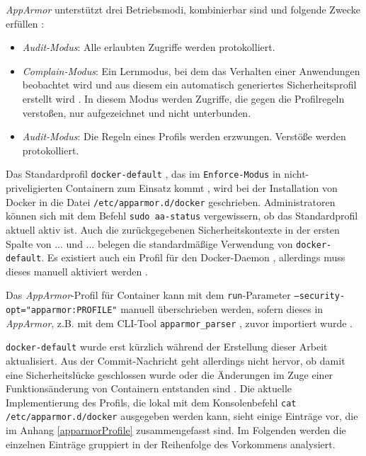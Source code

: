 \documentclass[../main.tex]{subfiles}
\begin{document}
				\emph{AppArmor} unterstützt drei Betriebsmodi, kombinierbar sind und folgende Zwecke erfüllen \cite[S.82]{SELinuxApparmor}:
				\begin{itemize}
					\item \emph{Audit-Modus}: Alle erlaubten Zugriffe werden protokolliert.
					\item \emph{Complain-Modus}: Ein Lernmodus, bei dem das Verhalten einer Anwendungen beobachtet wird und aus diesem ein automatisch generiertes Sicherheitsprofil erstellt wird \cite{linuxSecOverview}. In diesem Modus werden Zugriffe, die gegen die Profilregeln verstoßen, nur aufgezeichnet und nicht unterbunden.
					\item \emph{Audit-Modus}: Die Regeln eines Profils werden erzwungen. Verstöße werden protokolliert.
				\end{itemize}


				Das Standardprofil \texttt{docker-default} \cite{githubAppArmorProfileContainer}, das im \texttt{Enforce-Modus} in nicht-priveligierten Containern zum Einsatz kommt \cite{docker110Security}, wird bei der Installation von Docker in die Datei \texttt{/etc/apparmor.d/docker} geschrieben. Administratoren können sich mit dem Befehl \texttt{sudo aa-status} vergewissern, ob das Standardprofil aktuell aktiv ist. Auch die zurückgegebenen Sicherheitskontexte in der ersten Spalte von \fig ... und \fig ... belegen die standardmäßige Verwendung von \texttt{docker-default}. Es existiert auch ein Profil für den Docker-Daemon \cite{githubAppArmorProfileDaemon}, allerdings muss dieses manuell aktiviert werden \cite{githubAppArmorDoc}.

				Das \emph{AppArmor}-Profil für Container kann mit dem \texttt{run}-Parameter \texttt{--security-opt="apparmor:PROFILE"} manuell überschrieben werden, sofern dieses in \emph{AppArmor}, z.B. mit dem \acrshort{CLI}-Tool \texttt{apparmor\_parser} \cite{apparmorParser}, zuvor importiert wurde \cite{dockerRun}.

				\texttt{docker-default} wurde erst kürzlich während der Erstellung dieser Arbeit aktualisiert. Aus der Commit-Nachricht geht allerdings nicht hervor, ob damit eine Sicherheitslücke geschlossen wurde oder die Änderungen im Zuge einer Funktionsänderung von Containern entstanden sind \cite{githubAppArmorProfileContainerFix}. Die aktuelle Implementierung des Profils, die lokal mit dem Konsolenbefehl \texttt{cat /etc/apparmor.d/docker} ausgegeben werden kann, sieht einige Einträge vor, die im Anhang \ref{apparmorProfile} zusammengefasst sind. Im Folgenden werden die einzelnen Einträge gruppiert in der Reihenfolge des Vorkommens analysiert.
\end{document}
